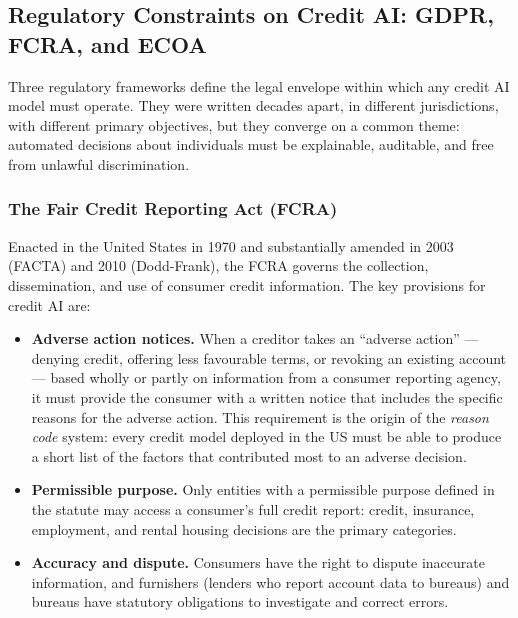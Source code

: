 \begin{context}
\subsection{Regulatory Constraints on Credit AI: GDPR, FCRA, and ECOA}
\label{subsec:credit-regulation}

Three regulatory frameworks define the legal envelope within which any credit AI model must operate. They were written decades apart, in different jurisdictions, with different primary objectives, but they converge on a common theme: automated decisions about individuals must be explainable, auditable, and free from unlawful discrimination.

\subsubsection*{The Fair Credit Reporting Act (FCRA)}

Enacted in the United States in 1970 and substantially amended in 2003 (FACTA) and 2010 (Dodd-Frank), the FCRA governs the collection, dissemination, and use of consumer credit information. The key provisions for credit AI are:

\begin{itemize}
  \item \textbf{Adverse action notices.} When a creditor takes an ``adverse action'' --- denying credit, offering less favourable terms, or revoking an existing account --- based wholly or partly on information from a consumer reporting agency, it must provide the consumer with a written notice that includes the specific reasons for the adverse action. This requirement is the origin of the \emph{reason code} system: every credit model deployed in the US must be able to produce a short list of the factors that contributed most to an adverse decision.

  \item \textbf{Permissible purpose.} Only entities with a permissible purpose defined in the statute may access a consumer's full credit report: credit, insurance, employment, and rental housing decisions are the primary categories.

  \item \textbf{Accuracy and dispute.} Consumers have the right to dispute inaccurate information, and furnishers (lenders who report account data to bureaus) and bureaus have statutory obligations to investigate and correct errors.
\end{itemize}


\end{context}
